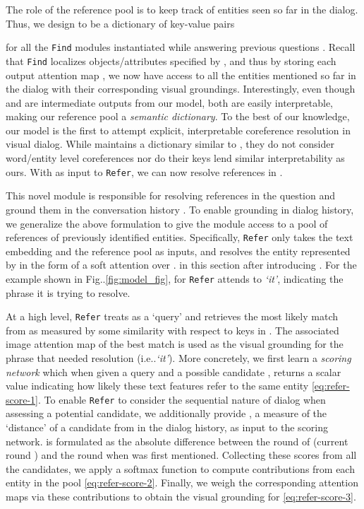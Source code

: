 \documentclass[runningheads]{llncs}
\makeatletter
\DeclareRobustCommand\onedot{\futurelet\@let@token\@onedot}
\def\@onedot{\ifx\@let@token.\else.\null\fi\xspace}
\def\ie{i.e\onedot} \def\Ie{I.e\onedot}
\def\Fig{Fig\onedot}
\newcommand{\myparagraph}[1]{\vspace{0pt}\noindent{\bf #1}}
\makeatother
\begin{document}
\myparagraph{Reference Pool ().}
The role of the reference pool is to keep track of entities seen so far
in the dialog.
Thus, we design  to be a dictionary of key-value pairs 
 
for all the \texttt{Find} modules instantiated while answering
previous questions .
Recall that \texttt{Find} localizes objects/attributes specified by 
, and thus by storing each output attention map , we now have 
access 
to all the entities mentioned so far in the dialog with their corresponding
visual groundings.
Interestingly, even though  and  are intermediate 
outputs from our model, both are easily interpretable, making our reference
pool a \emph{semantic dictionary}.
To the best of our knowledge, our model is the first to attempt explicit,
interpretable coreference resolution in visual dialog.
While \cite{paul2017visual} maintains a dictionary similar to ,
they do not consider word/entity level coreferences nor do their keys lend 
similar interpretability as ours.
With  as input to \texttt{Refer},
we can now resolve references in .

\myparagraph{\texttt{Refer} Module.}
This novel module is responsible for 
resolving references in the question  and ground them in the conversation 
history .
To enable grounding in dialog history, we generalize the above formulation
 to give the module access to a pool of references  of previously 
 identified entities.
Specifically, \texttt{Refer} only takes the text embedding  and the 
reference pool  as inputs, and resolves the entity represented by 
 in the form of a soft attention  over .
in this section after introducing .
For the example shown in \Fig\ref{fig:model_fig},
 for \texttt{Refer} attends to \textit{`it'}, indicating the phrase it
is trying to resolve.

At a high level, \texttt{Refer} treats  as a `query' and retrieves
the most likely match from  as measured by some similarity with
respect to keys  in .
The associated image attention map of the best match is used as the visual 
grounding for the phrase that needed resolution (\ie \textit{`it'}).
More concretely, we first learn a \textit{scoring network} which when given a 
query  and a possible candidate , returns a scalar value 
 indicating how likely these text features refer to the same entity
\eqref{eq:refer-score-1}.
To enable \texttt{Refer} to consider the sequential nature of dialog when 
assessing a potential candidate, we additionally provide , a measure of the `distance' of a candidate  from  
in the dialog history, as input to the scoring network.
 is formulated as the absolute difference between the round of
 (current round ) and the round when  was first
mentioned.
Collecting these scores from all the candidates, we apply a softmax function
to compute contributions  from each entity in the pool 
\eqref{eq:refer-score-2}.
Finally, we weigh the corresponding attention maps via these contributions
to obtain the visual grounding  for 
\eqref{eq:refer-score-3}.
\begin{multicols}{2}
\vspace*{-30pt}

\columnbreak

\end{multicols}
\vspace*{-20pt}
\end{document}
